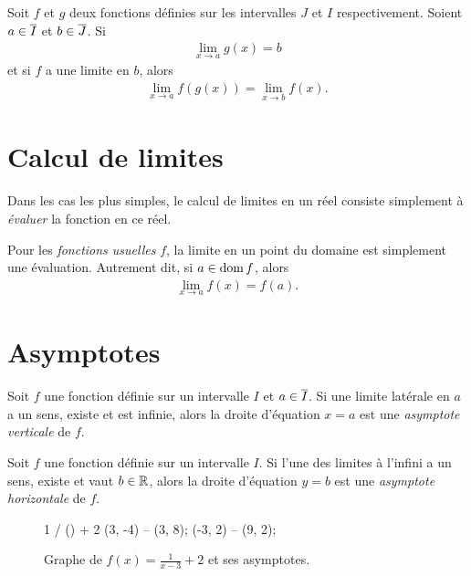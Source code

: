 \documentclass[main.tex]{subfiles}
\begin{document}
\begin{proposition}

    Soit $f$ et $g$ deux fonctions définies sur les intervalles $J$ et $I$ respectivement.
    Soient $a \in \overline{I}$ et $b \in \overline{J}$.
    Si
    \begin{align}
        \lim_{x \to a} g(x) = b
    \end{align}
    et si $f$ a une limite en $b$,
    alors
    \begin{align}
        \lim_{x \to a} f(g(x)) = \lim_{x \to b} f(x).
    \end{align}
\end{proposition}

\section{Calcul de limites}

Dans les cas les plus simples,
le calcul de limites en un réel consiste simplement à \emph{évaluer} la fonction en ce réel.

\begin{proposition}
    Pour les \emph{fonctions usuelles} $f$,
    la limite en un point du domaine est simplement une évaluation.
    Autrement dit,
    si $a \in \operatorname{dom} f$, alors
    \begin{align}
        \lim_{x \to a} f(x) = f(a).
    \end{align}
\end{proposition}

\section{Asymptotes}

\begin{definition}

    Soit $f$ une fonction définie sur un intervalle $I$ et $a \in \overline{I}$.
    Si une limite latérale en $a$ a un sens, existe et est infinie,
    alors la droite d'équation $x = a$ est
    une \emph{asymptote verticale} de $f$.
\end{definition}

\begin{definition}

    Soit $f$ une fonction définie sur un intervalle $I$.
    Si l'une des limites à l'infini a un sens, existe et vaut $b \in \mathbb{R}$,
    alors la droite d'équation $y = b$ est
    une \emph{asymptote horizontale} de $f$.
\end{definition}

\begin{figure}
    \centering
    \begin{plot}{0.5}{-3}{-4}{9}{8}
         {1 / () + 2}
        \drawline (3, -4) -- (3, 8);
        \drawline (-3, 2) -- (9, 2);
    \end{plot}
    \caption{Graphe de $f(x) = \frac 1 {x - 3} + 2$ et ses asymptotes.}
\end{figure}
\end{document}
